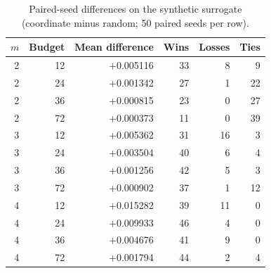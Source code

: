 \begin{table}[htbp]
\centering\small
\caption{Paired-seed differences on the synthetic surrogate (coordinate minus random; 50 paired seeds per row).}
\begin{tabular}{rrrrrr}
\toprule
$m$ & Budget & Mean difference & Wins & Losses & Ties\\
\midrule
2 & 12 & +0.005116 & 33 & 8 & 9\\
2 & 24 & +0.001342 & 27 & 1 & 22\\
2 & 36 & +0.000815 & 23 & 0 & 27\\
2 & 72 & +0.000373 & 11 & 0 & 39\\
3 & 12 & +0.005362 & 31 & 16 & 3\\
3 & 24 & +0.003504 & 40 & 6 & 4\\
3 & 36 & +0.001256 & 42 & 5 & 3\\
3 & 72 & +0.000902 & 37 & 1 & 12\\
4 & 12 & +0.015282 & 39 & 11 & 0\\
4 & 24 & +0.009933 & 46 & 4 & 0\\
4 & 36 & +0.004676 & 41 & 9 & 0\\
4 & 72 & +0.001794 & 44 & 2 & 4\\
\bottomrule
\end{tabular}
\label{tab:paired}
\end{table}

